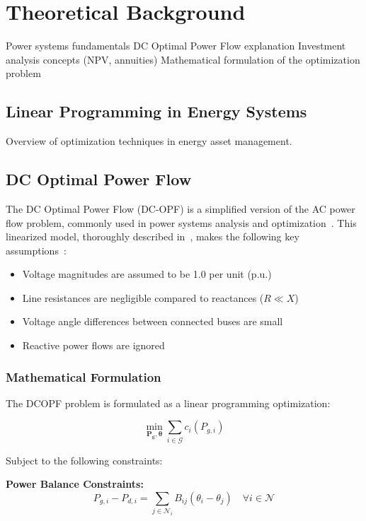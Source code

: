 \newpage
\section{Theoretical Background}
Power systems fundamentals
DC Optimal Power Flow explanation
Investment analysis concepts (NPV, annuities)
Mathematical formulation of the optimization problem
\subsection{Linear Programming in Energy Systems}
Overview of optimization techniques in energy asset management.

\subsection{DC Optimal Power Flow}
The DC Optimal Power Flow (DC-OPF) is a simplified version of the AC power flow problem, commonly used in power systems analysis and optimization~\cite{dc_opf}. This linearized model, thoroughly described in~\cite{andersson2004power}, makes the following key assumptions~\cite{wood2013power}:

\begin{itemize}
    \item Voltage magnitudes are assumed to be 1.0 per unit (p.u.)
    \item Line resistances are negligible compared to reactances ($R \ll X$)
    \item Voltage angle differences between connected buses are small
    \item Reactive power flows are ignored
\end{itemize}

\subsubsection{Mathematical Formulation}
The DCOPF problem is formulated as a linear programming optimization:

\begin{equation}
    \min_{\mathbf{P_g}, \boldsymbol{\theta}} \sum_{i \in \mathcal{G}} c_i(P_{g,i}) \label{eq:obj}
\end{equation}

Subject to the following constraints:

\textbf{Power Balance Constraints:}
\begin{equation}
    P_{g,i} - P_{d,i} = \sum_{j \in \mathcal{N}_i} B_{ij}(\theta_i - \theta_j) \quad \forall i \in \mathcal{N} \label{eq:power_balance}
\end{equation}

